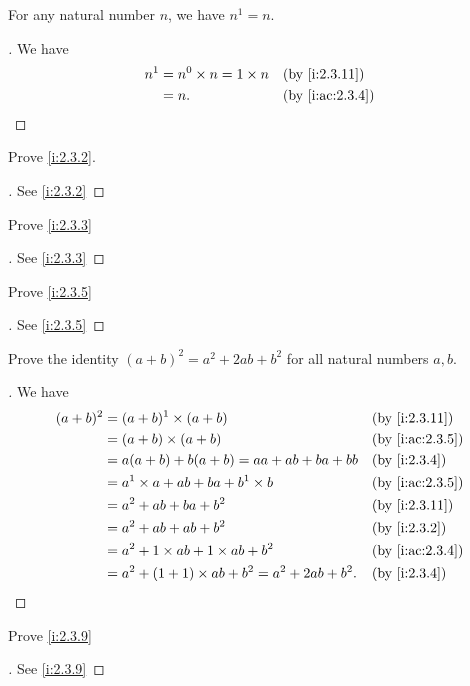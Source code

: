 \begin{ac}\label{i:ac:2.3.5}
  For any natural number \(n\), we have \(n^1 = n\).
\end{ac}

\begin{proof}[]
  We have
  \begin{align*}
    n^1 & = n^0 \times n = 1 \times n &  & \by{i:2.3.11}   \\
        & = n.                        &  & \by{i:ac:2.3.4}
  \end{align*}
\end{proof}

\exercisesection

\begin{ex}\label{i:ex:2.3.1}
  Prove \cref{i:2.3.2}.
\end{ex}

\begin{proof}[]
  See \cref{i:2.3.2}
\end{proof}

\begin{ex}\label{i:ex:2.3.2}
  Prove \cref{i:2.3.3}
\end{ex}

\begin{proof}[]
  See \cref{i:2.3.3}
\end{proof}

\begin{ex}\label{i:ex:2.3.3}
  Prove \cref{i:2.3.5}
\end{ex}

\begin{proof}[]
  See \cref{i:2.3.5}
\end{proof}

\begin{ex}\label{i:ex:2.3.4}
  Prove the identity \((a + b)^2 = a^2 + 2ab + b^2\) for all natural numbers \(a, b\).
\end{ex}

\begin{proof}[]
  We have
  \begin{align*}
    (a + b)^2 & = (a + b)^1 \times (a + b)                         &  & \by{i:2.3.11}   \\
              & = (a + b) \times (a + b)                           &  & \by{i:ac:2.3.5} \\
              & = a(a + b) + b(a + b) = aa + ab + ba + bb          &  & \by{i:2.3.4}    \\
              & = a^1 \times a + ab + ba + b^1 \times b            &  & \by{i:ac:2.3.5} \\
              & = a^2 + ab + ba + b^2                              &  & \by{i:2.3.11}   \\
              & = a^2 + ab + ab + b^2                              &  & \by{i:2.3.2}    \\
              & = a^2 + 1 \times ab + 1 \times ab + b^2            &  & \by{i:ac:2.3.4} \\
              & = a^2 + (1 + 1) \times ab + b^2 = a^2 + 2ab + b^2. &  & \by{i:2.3.4}
  \end{align*}
\end{proof}

\begin{ex}\label{i:ex:2.3.5}
  Prove \cref{i:2.3.9}
\end{ex}

\begin{proof}[]
  See \cref{i:2.3.9}
\end{proof}
